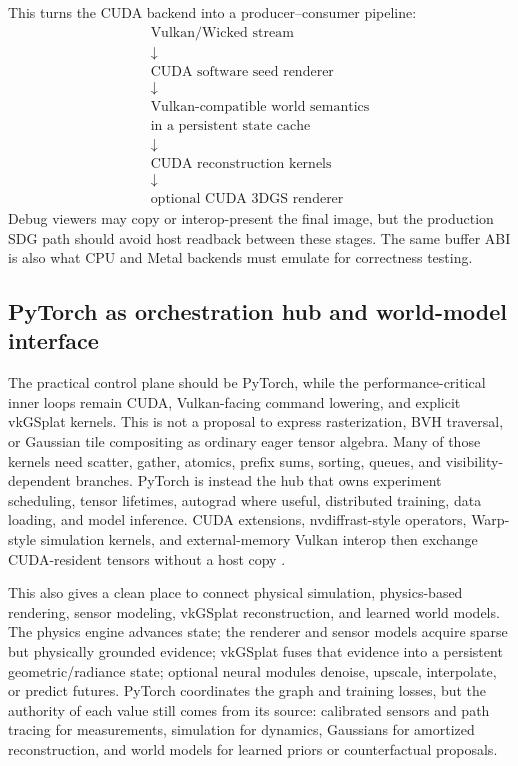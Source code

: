 \documentclass[10pt,journal,onecolumn]{IEEEtran}
\begin{document}
This turns the CUDA backend into a producer--consumer pipeline:
\[
\begin{gathered}
\text{Vulkan/Wicked stream}\\
\downarrow\\
\text{CUDA software seed renderer}\\
\downarrow\\
\text{Vulkan-compatible world semantics}\\
\text{in a persistent state cache}\\
\downarrow\\
\text{CUDA reconstruction kernels}\\
\downarrow\\
\text{optional CUDA 3DGS renderer}
\end{gathered}
\]
Debug viewers may copy or interop-present the final image, but the
production SDG path should avoid host readback between these stages.
The same buffer ABI is also what CPU and Metal backends must emulate for
correctness testing.

\subsection{PyTorch as orchestration hub and world-model interface}
\label{sec:pytorch-world-hub}

The practical control plane should be PyTorch, while the performance-critical
inner loops remain CUDA, Vulkan-facing command lowering, and explicit
vkGSplat kernels. This is not a proposal to express rasterization, BVH
traversal, or Gaussian tile compositing as ordinary eager tensor algebra. Many
of those kernels need scatter, gather, atomics, prefix sums, sorting, queues,
and visibility-dependent branches. PyTorch is instead the hub that owns
experiment scheduling, tensor lifetimes, autograd where useful, distributed
training, data loading, and model inference. CUDA extensions, nvdiffrast-style
operators, Warp-style simulation kernels, and external-memory Vulkan interop
then exchange CUDA-resident tensors without a host copy
\cite{paszke2019pytorch,nvidia-warp}.

This also gives a clean place to connect physical simulation, physics-based
rendering, sensor modeling, vkGSplat reconstruction, and learned world models.
The physics engine advances state; the renderer and sensor models acquire
sparse but physically grounded evidence; vkGSplat fuses that evidence into a
persistent geometric/radiance state; optional neural modules denoise,
upscale, interpolate, or predict futures. PyTorch coordinates the graph and
training losses, but the authority of each value still comes from its source:
calibrated sensors and path tracing for measurements, simulation for dynamics,
Gaussians for amortized reconstruction, and world models for learned priors or
counterfactual proposals.
\end{document}
